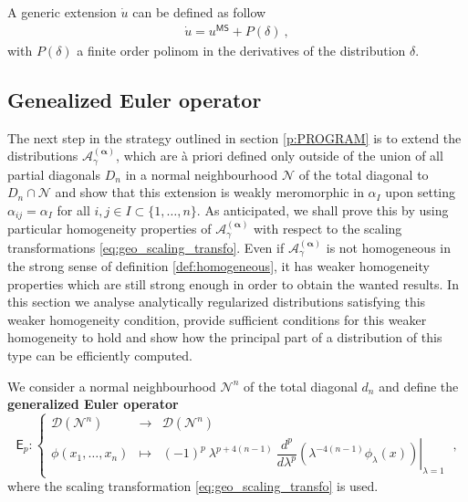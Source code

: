 \documentclass[12pt]{book}
\newcommand{\Acal}{\mathcal{A}}
\newcommand{\Dcal}{\mathcal{D}}
\newcommand{\Ncal}{\mathcal{N}}
\newcommand{\Esf}{\mathsf{E}}
\theoremstyle{break}
\begin{document}
A generic extension $\dot{u}$ can be defined as follow
% 
\begin{eqnarray*}
\dot{u} = u^{\mathsf{MS}} + P(\delta) \ ,
\end{eqnarray*}
%
with $P(\delta)$ a finite order polinom in the derivatives of the distribution $\delta$.


\subsection{Genealized Euler operator}\label{p:DIFFERENTIAL_EULER}


The next step in the strategy outlined in section \ref{p:PROGRAM} is to extend the distributions $\Acal^{(\boldsymbol{\alpha})}_\gamma$, which are à priori defined only outside of the union of all partial diagonals $D_n$ in a normal neighbourhood $\Ncal$ of the total diagonal to $D_n \cap \Ncal$ and show that this extension is weakly meromorphic in $\alpha_I$ upon setting $\alpha_{ij}=\alpha_I$ for all $i,j\in I\subset \{1,\ldots,n\}$. As anticipated, we shall prove this by using particular homogeneity properties of $\Acal^{(\boldsymbol{\alpha})}_\gamma$ with respect to the scaling transformations \eqref{eq:geo_scaling_transfo}. Even if $\Acal^{(\boldsymbol{\alpha})}_\gamma$ is not homogeneous in the strong sense of definition \ref{def:homogeneous}, it has weaker homogeneity properties which are still strong enough in order to obtain the wanted results. In this section we analyse analytically regularized distributions satisfying this weaker homogeneity condition, provide sufficient conditions for this weaker homogeneity to hold and show how the principal part of a distribution of this type can be efficiently computed.


\bigskip


We consider a normal neighbourhood $\Ncal^n$ of the total diagonal $d_n$ and define the \textbf{generalized Euler operator} 
%
\begin{equation}
\Esf_p : \left\{
\begin{array}{lcl}
\Dcal(\Ncal^n) & \to & \Dcal(\Ncal^n) \\
\phi(x_1,\dots, x_n) & \mapsto & \left. (-1)^p \ \lambda^{p+4(n-1)} \ \dfrac{d^p}{d\lambda^p} \left( \lambda^{-4(n-1)}  \phi_\lambda(x) \right) \right|_{\lambda = 1}
\end{array}
\right. \ ,
\label{eq:euler_op}
%
\end{equation}
%
where the scaling transformation \eqref{eq:geo_scaling_transfo} is used. 
\end{document}
